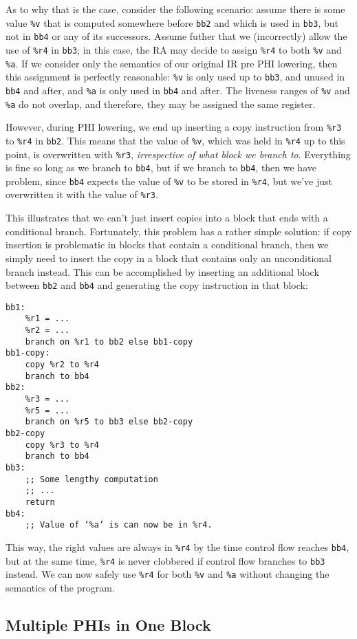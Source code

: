 \documentclass[12pt]{report}
\begin{document}
As to why that is the case, consider the following scenario: assume there is some value \verb|%v| that is computed somewhere before 
\verb|bb2| and which is used in \verb|bb3|, but not in \verb|bb4| or any of its successors. Assume futher that we (incorrectly) allow 
the use of \verb|%r4| in \verb|bb3|; in this case, the RA may decide to assign \verb|%r4| to both \verb|%v| and \verb|%a|. If we consider 
only the semantics of our original IR pre PHI lowering, then this assignment is perfectly reasonable: \verb|%v| is only used up to 
\verb|bb3|, and unused in \verb|bb4| and after, and \verb|%a| is only used in \verb|bb4| and after. The liveness ranges of \verb|%v| and 
\verb|%a| do not overlap, and therefore, they may be assigned the same register.

However, during PHI lowering, we end up inserting a copy instruction from \verb|%r3| to \verb|%r4| in \verb|bb2|. This means that the value
of \verb|%v|, which was held in \verb|%r4| up to this point, is overwritten with \verb|%r3|, \textit{irrespective of what block we branch 
to}. Everything is fine so long as we branch to \verb|bb4|, but if we branch to \verb|bb4|, then we have problem, since \verb|bb4|
expects the value of \verb|%v| to be stored in \verb|%r4|, but we've just overwritten it with the value of \verb|%r3|.

This illustrates that we can't just insert copies into a block that ends with a conditional branch. Fortunately, this problem has a rather
simple solution: if copy insertion is problematic in blocks that contain a conditional branch, then we simply need to insert the copy in a
block that contains only an unconditional branch instead. This can be accomplished by inserting an additional block between \verb|bb2| and
\verb|bb4| and generating the copy instruction in that block:
\begin{Verbatim}
bb1:
    %r1 = ...
    %r2 = ...
    branch on %r1 to bb2 else bb1-copy
bb1-copy:
    copy %r2 to %r4
    branch to bb4
bb2:
    %r3 = ...
    %r5 = ...
    branch on %r5 to bb3 else bb2-copy
bb2-copy
    copy %r3 to %r4
    branch to bb4
bb3:
    ;; Some lengthy computation
    ;; ...
    return
bb4:
    ;; Value of ‘%a’ is can now be in %r4.
\end{Verbatim}

\noindent This way, the right values are always in \verb|%r4| by the time control flow reaches \verb|bb4|, but at the same time, \verb|%r4|
is never clobbered if control flow branches to \verb|bb3| instead. We can now safely use \verb|%r4| for both \verb|%v| and \verb|%a| without
changing the semantics of the program.

\subsection{Multiple PHIs in One Block}
\end{document}
